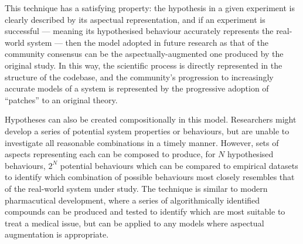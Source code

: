 This technique has a satisfying property: the hypothesis in a given experiment is
clearly described by its aspectual representation, and if an experiment is
successful --- meaning its hypothesised behaviour accurately represents the
real-world system --- then the model adopted in future research as that of the
community consensus can be the aspectually-augmented one produced by the
original study. In this way, the scientific process is directly represented in
the structure of the codebase, and the community's progression to increasingly
accurate models of a system is represented by the progressive adoption of
``patches'' to an original theory.

Hypotheses can also be created compositionally in this model. Researchers might
develop a series of potential system properties or behaviours, but are unable to
investigate all reasonable combinations in a timely manner. However, sets of
aspects representing each can be composed to produce, for $N$ hypothesised
behaviours, $2^N$ potential behaviours which can be compared to empirical
datasets to identify which combination of possible behaviours most closely
resembles that of the real-world system under study. The technique is similar to
modern pharmacutical development, where a series of algorithmically identified
compounds can be produced and tested to identify which are most suitable to
treat a medical issue, but can be applied to any models where aspectual augmentation
is appropriate.

